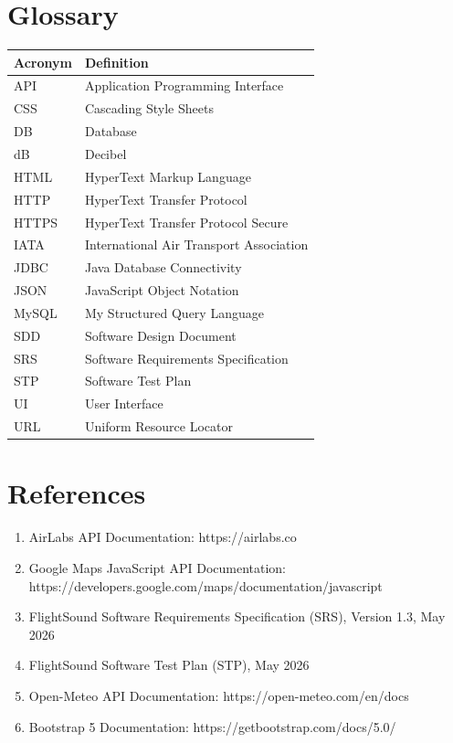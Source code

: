 \documentclass[12pt]{article}
\begin{document}
\newpage

\section{Glossary}

\begin{tabular}{|l|l|}
\hline
Acronym & Definition \\
\hline
API & Application Programming Interface \\
CSS & Cascading Style Sheets \\
DB & Database \\
dB & Decibel \\
HTML & HyperText Markup Language \\
HTTP & HyperText Transfer Protocol \\
HTTPS & HyperText Transfer Protocol Secure \\
IATA & International Air Transport Association \\
JDBC & Java Database Connectivity \\
JSON & JavaScript Object Notation \\
MySQL & My Structured Query Language \\
SDD & Software Design Document \\
SRS & Software Requirements Specification \\
STP & Software Test Plan \\
UI & User Interface \\
URL & Uniform Resource Locator \\
\hline
\end{tabular}

\newpage

\section{References}

\begin{enumerate}
\item AirLabs API Documentation: https://airlabs.co
\item Google Maps JavaScript API Documentation: https://developers.google.com/maps/documentation/javascript
\item FlightSound Software Requirements Specification (SRS), Version 1.3, May 2026
\item FlightSound Software Test Plan (STP), May 2026
\item Open-Meteo API Documentation: https://open-meteo.com/en/docs
\item Bootstrap 5 Documentation: https://getbootstrap.com/docs/5.0/
\end{enumerate}
\end{document}
